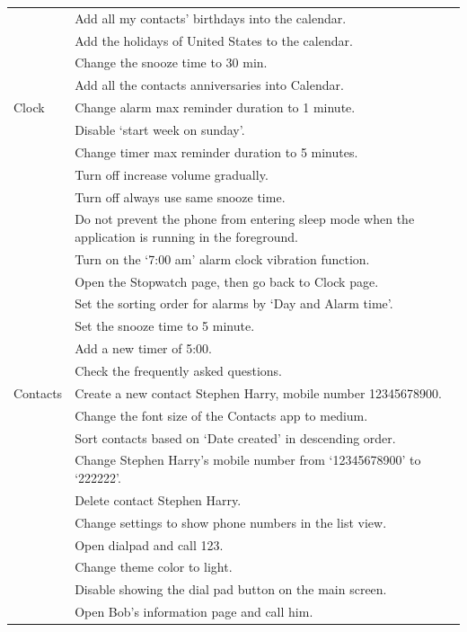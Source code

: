 \begin{longtable}{|p{1.8cm}|p{10.5cm}|}
        & Add all my contacts' birthdays into the calendar. \\
        & Add the holidays of United States to the calendar. \\
        & Change the snooze time to 30 min. \\
        & Add all the contacts anniversaries into Calendar. \\
\hline
Clock & Change alarm max reminder duration to 1 minute. \\
      \hline
      & Disable `start week on sunday'. \\
      & Change timer max reminder duration to 5 minutes. \\
      & Turn off increase volume gradually. \\
      & Turn off always use same snooze time. \\
      & Do not prevent the phone from entering sleep mode when the application is running in the foreground. \\
      & Turn on the `7:00 am' alarm clock vibration function. \\
      & Open the Stopwatch page, then go back to Clock page. \\
      & Set the sorting order for alarms by `Day and Alarm time'. \\
      & Set the snooze time to 5 minute. \\
      & Add a new timer of 5:00. \\
      & Check the frequently asked questions. \\
\hline
Contacts & Create a new contact Stephen Harry, mobile number 12345678900. \\
         & Change the font size of the Contacts app to medium. \\
         & Sort contacts based on `Date created' in descending order. \\
         & Change Stephen Harry's mobile number from `12345678900' to `222222'. \\
         & Delete contact Stephen Harry. \\
         & Change settings to show phone numbers in the list view. \\
         & Open dialpad and call 123. \\
         & Change theme color to light. \\
         & Disable showing the dial pad button on the main screen. \\
         & Open Bob's information page and call him. \\

\end{longtable}
